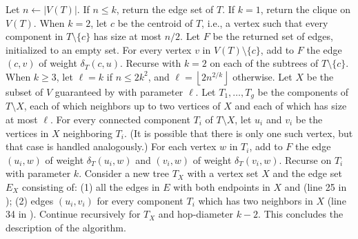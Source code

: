 \documentclass[11pt,english]{article}
\newcommand{\floor}[1]{\ensuremath{\left\lfloor#1\right\rfloor}}
\begin{document}
Let $n \gets |V(T)|$. If $n \le k$, return the edge set of $T$. If $k = 1$, return the clique on $V(T)$. 
When $k=2$, let $c$ be the centroid of $T$, i.e., a vertex such that every component in $T \setminus \{c\}$ has size at most $n/2$. Let $F$ be the returned set of edges, initialized to an empty set. For every vertex $v$ in $V(T) \setminus \{c\}$, add to $F$ the edge $(c,v)$ of weight $\delta_T(c,u)$. Recurse with $k=2$ on each of the subtrees of $T \setminus \{c \}$. 
When $k\ge 3$, let $\ell = k$ if $n \le 2k^2$, and $\ell = \floor{2n^{2/k}}$ otherwise.
Let $X$ be the subset of $V$ guaranteed by  with parameter $\ell$. Let $T_1, \ldots, T_g$ be the components of $T \setminus X$, each of which neighbors up to two vertices of $X$ and each of which has size at most $\ell$. 
For every connected component $T_i$ of $T \setminus X$, let $u_i$ and $v_i$ be the vertices in $X$ neighboring $T_i$. (It is possible that there is only one such vertex, but that case is handled analogously.) For each vertex $w$ in $T_i$, add to $F$ the edge $(u_i, w)$ of weight $\delta_T(u_i, w)$ and $(v_i, w)$ of weight $\delta_T(v_i, w)$. Recurse on $T_i$ with parameter $k$.
Consider a new tree $T_X$ with a vertex set $X$ and the edge set $E_X$ consisting of: (1) all the edges in $E$ with both endpoints in $X$ and (line 25 in ); (2) edges $(u_i, v_i)$ for every component $T_i$ which has two neighbors in $X$ (line 34 in ). Continue recursively for $T_X$ and hop-diameter $k-2$. This concludes the description of the algorithm.
\end{document}
